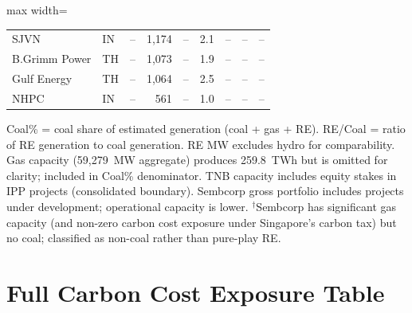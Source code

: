 \documentclass[review,3p,authoryear]{elsarticle}
\begin{document}
\begin{table}[H]
\begin{adjustbox}{max width=\linewidth}
\begin{tabular}{@{}llrrrrrrl@{}}
SJVN & IN & -- & 1,174 & -- & 2.1 & -- & -- & -- \\
B.Grimm Power & TH & -- & 1,073 & -- & 1.9 & -- & -- & -- \\
Gulf Energy & TH & -- & 1,064 & -- & 2.5 & -- & -- & -- \\
NHPC & IN & -- & 561 & -- & 1.0 & -- & -- & -- \\
\bottomrule
\end{tabular}
\end{adjustbox}
\begin{flushleft}
\footnotesize{Coal\% = coal share of estimated generation (coal + gas + RE). RE/Coal = ratio of RE generation to coal generation. RE MW excludes hydro for comparability. Gas capacity (59,279~MW aggregate) produces 259.8~TWh but is omitted for clarity; included in Coal\% denominator. TNB capacity includes equity stakes in IPP projects (consolidated boundary). Sembcorp gross portfolio includes projects under development; operational capacity is lower. $^{\dagger}$Sembcorp has significant gas capacity (and non-zero carbon cost exposure under Singapore's carbon tax) but no coal; classified as non-coal rather than pure-play RE.}
\end{flushleft}
\end{table}

\section{Full Carbon Cost Exposure Table}
\label{app:carbon_full}
\end{document}
